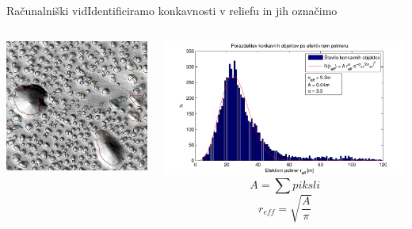 \documentclass{beamer}
\begin{document}
\begin{frame}{Računalniški vid}{Identificiramo konkavnosti v reliefu in jih označimo}
\begin{columns}
  \begin{column}{0.55\textwidth}
    \hspace*{0.02\textwidth}\includegraphics[width=\textwidth]{slike/menisija-vrtace}
  \end{column}

  \begin{column}{0.7\textwidth}
    \hspace*{-0.025\textwidth}\includegraphics[width=\textwidth]{slike/menisija-polmeri-hist-maxwell}
    \footnotesize
    \[ A = \sum piksli\]
    \[ r_{eff} = \sqrt{\frac{A}{\pi}} \]
  \end{column}
\end{columns}
\end{frame}
\end{document}
